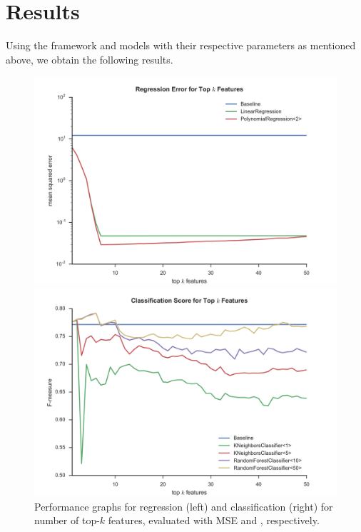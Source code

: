 \section{Results}
\label{sec:four}

Using the framework and models with their respective parameters as mentioned
above, we obtain the following results.

\begin{figure}[h]
\centering
\begin{minipage}{.49\textwidth}
  \centering
  \includegraphics[width=\linewidth]{figures/reg_mse_train.png}
\end{minipage}
\begin{minipage}{.49\textwidth}
  \centering
  \includegraphics[width=\linewidth]{figures/cls_fscore_train.png}
\end{minipage}
\caption{Performance graphs for regression (left) and classification (right) for
  number of top-$k$ features, evaluated with MSE and \fmeasure, respectively.}
\label{fig:training}
\end{figure}

